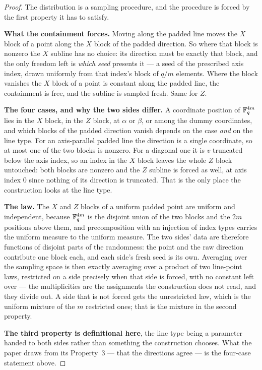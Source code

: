 \begin{proof}
\leanok
{}
The distribution is a sampling procedure, and the procedure is forced by the first property it
has to satisfy.

\textbf{What the containment forces.} Moving along the padded line moves the $X$ block of a point
along the $X$ block of the padded direction. So where that block is nonzero the $X$ subline has no
choice: its direction must be exactly that block, and the only freedom left is \emph{which seed}
presents it --- a seed of the prescribed axis index, drawn uniformly from that index's block of
$q/m$ elements. Where the block vanishes the $X$ block of a point is constant along the padded
line, the containment is free, and the subline is sampled fresh. Same for $Z$.

\textbf{The four cases, and why the two sides differ.} A coordinate position of
$\mathbb{F}_q^{4m}$ lies in the $X$ block, in the $Z$ block, at $\alpha$ or $\beta$, or among the dummy
coordinates, and which blocks of the padded direction vanish depends on the case \emph{and} on the
line type. For an axis-parallel padded line the direction is a single coordinate, so at most one of
the two blocks is nonzero. For a diagonal one it is $v$ truncated below the axis index, so an index
in the $X$ block leaves the whole $Z$ block untouched: both blocks are nonzero and the $Z$ subline
is forced as well, at axis index $0$ since nothing of its direction is truncated. That is the only
place the construction looks at the line type.

\textbf{The law.} The $X$ and $Z$ blocks of a uniform padded point are uniform and independent,
because $\mathbb{F}_q^{4m}$ is the disjoint union of the two blocks and the $2m$ positions above them, and
precomposition with an injection of index types carries the uniform measure to the uniform measure.
The two sides' data are therefore functions of disjoint parts of the randomness: the point and the
raw direction contribute one block each, and each side's fresh seed is its own. Averaging over the
sampling space is then exactly averaging over a product of two line-point laws, restricted on a side
precisely when that side is forced, with no constant left over --- the multiplicities are the
assignments the construction does not read, and they divide out. A side that is not forced gets the
unrestricted law, which is the uniform mixture of the $m$ restricted ones; that is the mixture in
the second property.

\textbf{The third property is definitional here}, the line type being a parameter handed to both
sides rather than something the construction chooses. What the paper draws from its Property~3 ---
that the directions agree --- is the four-case statement above.
\end{proof}

